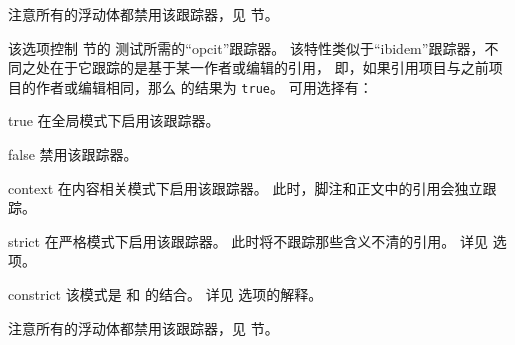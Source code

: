 \begin{optionlist}
注意所有的浮动体都禁用该跟踪器，见  节。



该选项控制  节的  测试所需的“opcit”跟踪器。
该特性类似于“ibidem”跟踪器，不同之处在于它跟踪的是基于某一作者或编辑的引用，
即，如果引用项目与之前项目的作者或编辑相同，那么  的结果为 \texttt{true}。
可用选择有：

\begin{valuelist}
\item[true] %
在全局模式下启用该跟踪器。
\item[false] %
禁用该跟踪器。
\item[context] %
在内容相关模式下启用该跟踪器。
此时，脚注和正文中的引用会独立跟踪。
\item[strict] %
在严格模式下启用该跟踪器。
此时将不跟踪那些含义不清的引用。
详见  选项。
\item[constrict] %
该模式是  和  的结合。
详见   选项的解释。
\end{valuelist}

注意所有的浮动体都禁用该跟踪器，见  节。




\end{optionlist}
